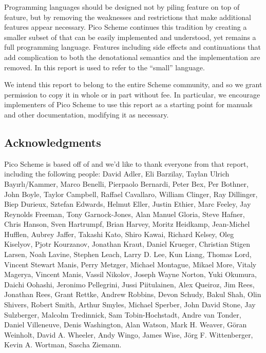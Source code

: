 
\label{historysection}

Programming languages should be designed not by piling feature on top
of feature, but by removing the weaknesses and restrictions that make
additional features appear necessary.  Pico Scheme continues this
tradition by creating a smaller subset of \rsevenrs{} that can be easily
implemented and understood, yet remains a full programming
language. Features including side effects and continuations that add
complication to both the denotational semantics and the implementation
are removed. In this report \rsevenrs{} is used to refer to the ``small''
language.



\medskip

We intend this report to belong to the entire Scheme community, and so
we grant permission to copy it in whole or in part without fee.  In
particular, we encourage implementers of Pico Scheme to use this report as
a starting point for manuals and other documentation, modifying it as
necessary.



\subsection*{Acknowledgments}

Pico Scheme is based off of \rsevenrs{}\cite{R7RS} and we'd like to thank everyone from
that report, including the following people: David Adler, Eli
Barzilay, Taylan Ulrich Bay\i{}rl\i/Kammer, Marco Benelli, Pierpaolo
Bernardi, Peter Bex, Per Bothner, John Boyle, Taylor Campbell, Raffael
Cavallaro, William Clinger, Ray Dillinger, Biep Durieux, Sztefan
Edwards, Helmut Eller, Justin Ethier, Marc Feeley, Jay Reynolds
Freeman, Tony Garnock-Jones, Alan Manuel Gloria, Steve Hafner, Chris
Hanson, Sven Hartrumpf, Brian Harvey, Moritz Heidkamp, Jean-Michel
Hufflen, Aubrey Jaffer, Takashi Kato, Shiro Kawai, Richard Kelsey,
Oleg Kiselyov, Pjotr Kourzanov, Jonathan Kraut, Daniel Krueger,
Christian Stigen Larsen, Noah Lavine, Stephen Leach, Larry D. Lee, Kun
Liang, Thomas Lord, Vincent Stewart Manis, Perry Metzger, Michael
Montague, Mikael More, Vitaly Magerya, Vincent Manis, Vassil Nikolov,
Joseph Wayne Norton, Yuki Okumura, Daichi Oohashi, Jeronimo
Pellegrini, Jussi Piitulainen, Alex Queiroz, Jim Rees, Jonathan Rees,
Grant Rettke, Andrew Robbins, Devon Schudy, Bakul Shah, Olin Shivers,
Robert Smith, Arthur Smyles, Michael Sperber, John David Stone, Jay
Sulzberger, Malcolm Tredinnick, Sam Tobin-Hochstadt, Andre van Tonder,
Daniel Villeneuve, Denis Washington, Alan Watson, Mark H.  Weaver,
G\"oran Weinholt, David A. Wheeler, Andy Wingo, James Wise, J\"org
F. Wittenberger, Kevin A. Wortman, Sascha Ziemann.

